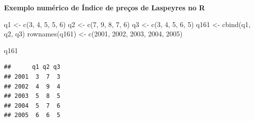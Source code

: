 \documentclass[
]{book}
\newenvironment{Shaded}{\begin{snugshade}}{\end{snugshade}}
\newcommand{\DecValTok}[1]{\textcolor[rgb]{0.00,0.00,0.81}{#1}}
\newcommand{\FunctionTok}[1]{\textcolor[rgb]{0.00,0.00,0.00}{#1}}
\newcommand{\NormalTok}[1]{#1}
\newcommand{\OtherTok}[1]{\textcolor[rgb]{0.56,0.35,0.01}{#1}}
\begin{document}
\textbf{Exemplo numérico de Índice de preços de Laspeyres no R}

\begin{Shaded}
\begin{Highlighting}[]
\NormalTok{q1 }\OtherTok{\textless{}{-}} \FunctionTok{c}\NormalTok{(}\DecValTok{3}\NormalTok{, }\DecValTok{4}\NormalTok{, }\DecValTok{5}\NormalTok{, }\DecValTok{5}\NormalTok{, }\DecValTok{6}\NormalTok{)}
\NormalTok{q2 }\OtherTok{\textless{}{-}} \FunctionTok{c}\NormalTok{(}\DecValTok{7}\NormalTok{, }\DecValTok{9}\NormalTok{, }\DecValTok{8}\NormalTok{, }\DecValTok{7}\NormalTok{, }\DecValTok{6}\NormalTok{)}
\NormalTok{q3 }\OtherTok{\textless{}{-}} \FunctionTok{c}\NormalTok{(}\DecValTok{3}\NormalTok{, }\DecValTok{4}\NormalTok{, }\DecValTok{5}\NormalTok{, }\DecValTok{6}\NormalTok{, }\DecValTok{5}\NormalTok{)}
\NormalTok{q161 }\OtherTok{\textless{}{-}} \FunctionTok{cbind}\NormalTok{(q1, q2, q3)}
\FunctionTok{rownames}\NormalTok{(q161) }\OtherTok{\textless{}{-}} \FunctionTok{c}\NormalTok{(}\DecValTok{2001}\NormalTok{, }\DecValTok{2002}\NormalTok{, }\DecValTok{2003}\NormalTok{, }\DecValTok{2004}\NormalTok{, }\DecValTok{2005}\NormalTok{)}

\NormalTok{q161}
\end{Highlighting}
\end{Shaded}

\begin{verbatim}
##      q1 q2 q3
## 2001  3  7  3
## 2002  4  9  4
## 2003  5  8  5
## 2004  5  7  6
## 2005  6  6  5
\end{verbatim}
\end{document}

